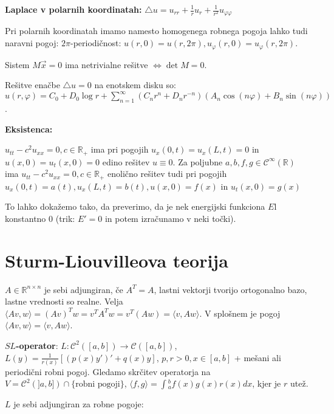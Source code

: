 \documentclass[11pt,a4paper]{amsart}
\theoremstyle{definition} %
\theoremstyle{plain} %
\let\oldint\int
\renewcommand{\int}{\oldint \!}
\newcommand{\R}{\mathbb R}
\begin{document}
\textbf{Laplace v polarnih koordinatah:} $\triangle u = u_{rr} + \frac{1}{r}u_r + \frac{1}{r^2}u_{\varphi \varphi}$

Pri polarnih koordinatah imamo namesto homogenega robnega pogoja lahko tudi naravni pogoj: $2\pi$-periodičnost: $u(r,0) = u(r,2\pi), u_\varphi (r,0) = u_\varphi (r,2\pi)$.

Sistem $M\vec{x} = 0 $ ima netrivialne rešitve $\Longleftrightarrow \det{M} = 0$.

Rešitve enačbe $\triangle u = 0$ na enotskem disku so: $u(r, \varphi) = C_0 + D_0 \log r + \sum_{n = 1}^\infty (C_n r^n + D_n r^{-n}) (A_n \cos(n \varphi) + B_n \sin(n \varphi))$.

\textbf{Eksistenca:}

$u_{tt}-c^2u_{xx}=0, c \in \R_+$ ima pri pogojih $u_x(0,t) = u_x(L,t)=0$ in $u(x,0) = u_t(x,0) = 0$ edino rešitev $u \equiv 0$. Za poljubne $a,b,f,g \in \mathcal{C}^\infty (\R)$ ima $u_{tt}-c^2u_{xx}=0, c \in \R_+$ enolično rešitev tudi pri pogojih $u_x(0,t) = a(t),u _x(L,t)=b(t), u(x,0) = f(x)$ in $u_t(x,0) = g(x)$

To lahko dokažemo tako, da preverimo, da je nek energijski funkciona $E$l konstantno 0 (trik: $E' = 0$ in potem izračunamo v neki točki).

\vspace{-.4cm}  %

\section*{Sturm-Liouvilleova teorija}

$A \in \R^{n \times n}$ je sebi adjungiran, če $A^T = A$, lastni vektorji tvorijo ortogonalno bazo, lastne vrednosti so realne. Velja $\langle Av,w \rangle = (Av)^Tw = v^TA^Tw = v^T(Aw) = \langle v,Aw \rangle$. V splošnem je pogoj $\langle Av,w \rangle = \langle v,Aw \rangle$.

\textbf{$SL$-operator}: $L:\mathcal{C}^2([a,b])\longrightarrow \mathcal{C}([a,b])$, $L(y) = \frac{1}{r(x)}[(p(x)y')'+q(x)y]$, $p,r > 0, x \in [a,b]$ + mešani ali periodični robni pogoj. Gledamo skrčitev operatorja na $V = \mathcal{C}^2(]a,b]) \cap \{\text{robni pogoji}\}$, $\langle f,g\rangle = \int_a^bf(x)g(x)r(x)dx$, kjer je $r$ utež.

$L$ je sebi adjungiran za robne pogoje:
\end{document}
